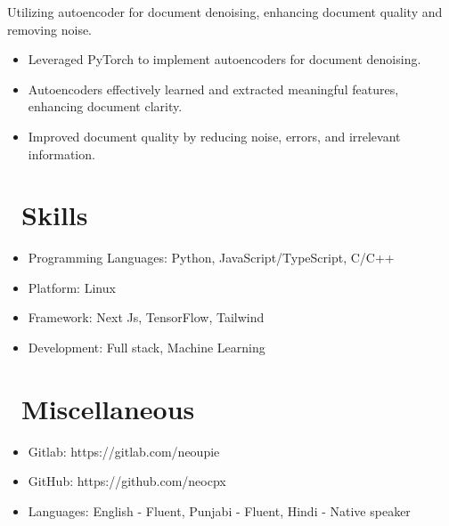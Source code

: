 \documentclass{resume}
\begin{document}
Utilizing autoencoder for document denoising, enhancing document quality and removing noise.
\begin{itemize}
  \item Leveraged PyTorch to implement autoencoders for document denoising.
  \item Autoencoders effectively learned and extracted meaningful features, enhancing document clarity.
  \item Improved document quality by reducing noise, errors, and irrelevant information.
\end{itemize}


\section{\faCogs\ Skills}
\begin{itemize}[parsep=0.5ex]
  \item Programming Languages: Python, JavaScript/TypeScript, C/C++
  \item Platform: Linux
  \item Framework: Next Js, TensorFlow, Tailwind
  \item Development: Full stack, Machine Learning
\end{itemize}

\section{\faInfo\ Miscellaneous}
\begin{itemize}[parsep=0.5ex]
  \item Gitlab: https://gitlab.com/neoupie
  \item GitHub: https://github.com/neocpx
  \item Languages: English - Fluent, Punjabi - Fluent, Hindi - Native speaker
\end{itemize}

%
%
\end{document}
